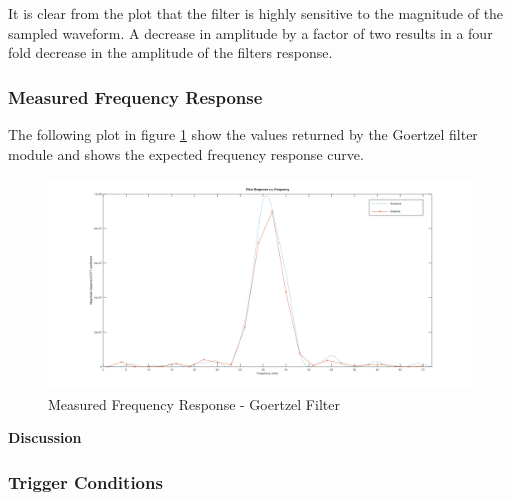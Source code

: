 It is clear from the plot that the filter is highly sensitive to the magnitude of the sampled waveform. A decrease in amplitude by a factor of two results in a four fold decrease in the amplitude of the filters response.




\subsubsection{Measured Frequency Response}

The following plot in figure \ref{fig:goertzel_filter_response_empirical} show the values returned by the Goertzel filter module and shows the expected frequency response curve.

\begin{figure}[H]
	\centering
	\includegraphics[width=\linewidth]{figures/results/goertzel_filter_empirical_wide.png}
	\caption{Measured Frequency Response - Goertzel Filter}
	\label{fig:goertzel_filter_response_empirical}
\end{figure}


\textbf{Discussion}\\




\subsubsection{Trigger Conditions}

